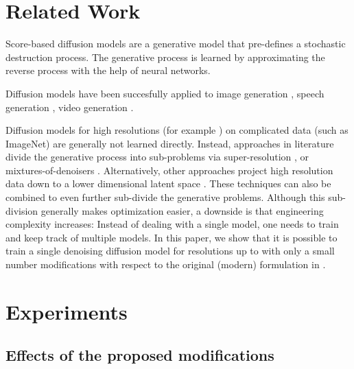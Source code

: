 \documentclass[nohyperref]{article}
\theoremstyle{plain}
\theoremstyle{definition}
\theoremstyle{remark}
\begin{document}
\section{Related Work}
Score-based diffusion models \citep{sohldickstein2015diffusion,song2019generativemodellingestimatinggradient,ho2020denoising} are a generative model that pre-defines a stochastic destruction process. The generative process is learned by approximating the reverse process with the help of neural networks. 

Diffusion models have been succesfully applied to image generation \citep{ho2020denoising,ho2022cascaded}, speech generation \citep{chen2020wavegrad,kong2021diffwave}, video generation \citep{singer2022makeavideo,saharia2022imagen}.

Diffusion models for high resolutions (for example ) on complicated data (such as ImageNet) are generally not learned directly. Instead, approaches in literature divide the generative process into sub-problems via super-resolution \citep{ho2022cascaded}, or mixtures-of-denoisers \citep{feng2022ernievilg,balaji2022ediffi}. Alternatively, other approaches project high resolution data down to a lower dimensional latent space \citep{rombach2022highresolution}. These techniques can also be combined to even further sub-divide the generative problems. Although this sub-division generally makes optimization easier, a downside is that engineering complexity increases: Instead of dealing with a single model, one needs to train and keep track of multiple models. In this paper, we show that it is possible to train a single denoising diffusion model for resolutions up to  with only a small number modifications with respect to the original (modern) formulation in \citep{ho2020denoising}.

 
\section{Experiments}
\label{sec:results}


\subsection{Effects of the proposed modifications}
\end{document}
